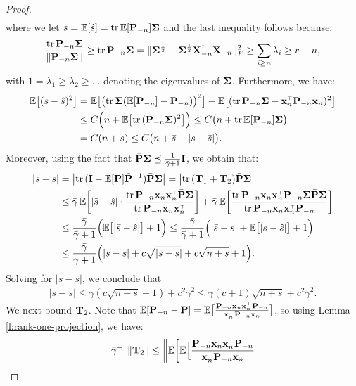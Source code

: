 \documentclass[11pt]{article}
\begin{document}
\begin{proof}
\begin{align*}
\end{align*}
where we let $s=\mathbb E[\hat s]=\mathrm{tr}\,\mathbb E[\mathbf P_{-n}]\mathbf{\Sigma}$ and the last
inequality follows because:
\begin{align*}
    \frac{\mathrm{tr}\,\mathbf P_{-n}\mathbf{\Sigma}} {\|\mathbf P_{-n}\mathbf{\Sigma}\|}\geq
    \mathrm{tr}\,\mathbf P_{-n}\mathbf{\Sigma} =
    \|\mathbf{\Sigma}^{\frac12}-\mathbf{\Sigma}^{\frac12}\mathbf X_{-n}^\dagger\mathbf X_{-n}\|_F^2\geq
\sum_{i\geq n}\lambda_i\geq r-n,
\end{align*}
with $1=\lambda_1\geq\lambda_2\geq...$ denoting the eigenvalues of $\mathbf{\Sigma}$.
Furthermore, we have:
\begin{align*}
  \E\big[(s - \hat s)^2\big] &=
\E\big[\big(\tr\,\Sigmab(\E[\P_{-n}]-\P_{-n})\big)^2\big] +
  \E\big[(\tr\,\P_{-n}\Sigmab-\x_n^\top\P_{-n}\x_n)^2\big]\\
  &\leq C\Big(n + \E\big[\tr\,(\P_{-n}\Sigmab)^2\big]\Big)\leq
    C\big(n + \tr\,\E[\P_{-n}]\Sigmab\big)\\
  &=C(n+s)\leq C\big(n+\bar s + |s- \bar s|\big).
\end{align*}
Moreover, using the fact that
$\bar{\mathbf P}\mathbf{\Sigma}\preceq\frac1{\bar\gamma+1}\mathbf I$, we obtain that:
\begin{align*}
  |\bar s - s|
  &= \big|\tr\,(\I-\E[\P]\bar\P^{-1})\bar\P\Sigmab\big|
    =\big|\tr\,(\T_1+\T_2)\bar\P\Sigmab\big|\\
  &\leq \bar\gamma\,\E\bigg[|\bar s-\hat s|\cdot
    \frac{\tr\,\P_{-n}\x_n\x_n^\top\bar\P\Sigmab}{\tr\,\P_{-n}\x_n\x_n^\top}\bigg]
    + \bar\gamma\,
    \E\bigg[\frac{\tr\,\P_{-n}\x_n\x_n^\top\P_{-n}\Sigmab\bar\P\Sigmab}
    {\tr\,\P_{-n}\x_n\x_n^\top\P_{-n}}\bigg]\\
  &\leq \frac{\bar\gamma}{\bar\gamma+1}\Big(\E\big[|\bar s-\hat
    s|\big] + 1\Big)\leq \frac{\bar\gamma}{\bar\gamma+1}\Big(|\bar
    s-s| + \E\big[|s-\hat
    s|\big] + 1\Big)\\
  &\leq \frac{\bar\gamma}{\bar\gamma+1}\Big(|\bar s- s| +
     c\sqrt{|\bar s- s|} + c\sqrt{n+\bar s} + 1\Big).
\end{align*}
Solving for $|\bar s-s|$, we conclude that
\begin{align*}
  |\bar s-s|\leq
  \bar\gamma(c\sqrt{n+\bar s}+1) + c^2\bar\gamma^2\leq \bar\gamma
  (c+1)\sqrt{n+\bar s} + c^2\bar\gamma^2.
\end{align*}
We next bound $\mathbf{T}_2$. Note that $\E[\P_{-n}-\P] =
\E\big[\frac{\P_{-n}\x_n\x_n^\top\P_{-n}}{\x_n^\top\P_{-n}\x_n}\big]$, so
using Lemma \ref{l:rank-one-projection}, we have:
\begin{align*}
\bar\gamma^{-1}\|\T_2\|\leq  \bigg\|
  \E\bigg[\E\Big[\frac{\P_{-n}\x_n\x_n^\top\P_{-n}}{\x_n^\top\P_{-n}\x_n}

\end{align*}
\end{proof}
\end{document}
